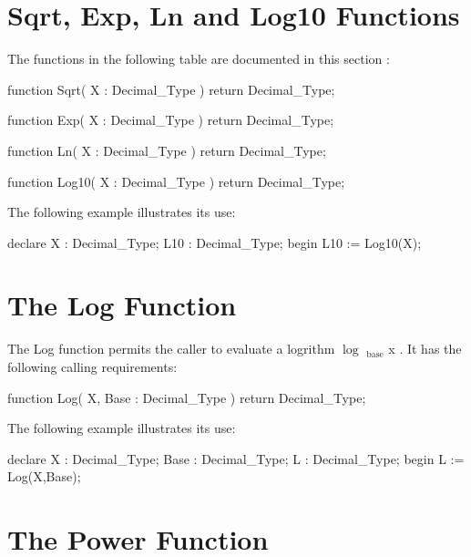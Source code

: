 \documentclass[english,letterpaper]{book}
\begin{document}
\section{Sqrt, Exp, Ln and Log10 Functions}

The functions in the following table are documented in this section%
:

\begin{Code}
function Sqrt(
   X : Decimal_Type
) return Decimal_Type;
\end{Code}

\begin{Code}
function Exp(
   X : Decimal_Type
) return Decimal_Type;
\end{Code}

\begin{Code}
function Ln(
   X : Decimal_Type
) return Decimal_Type;
\end{Code}

\begin{Code}
function Log10(
   X : Decimal_Type
) return Decimal_Type;
\end{Code}

The following example illustrates its use:

\begin{Example}
declare
   X :   Decimal_Type;
   L10 : Decimal_Type;
begin
   L10 := Log10(X);
\end{Example}

\section{The Log Function}

The Log function permits the caller to evaluate a logrithm $\log$
$_{\textrm{base}}$ x . It has the following calling requirements:

\begin{Code}
function Log(
   X, Base : Decimal_Type
) return Decimal_Type;
\end{Code}

The following example illustrates its use:

\begin{Example}
declare
   X :    Decimal_Type;
   Base : Decimal_Type;
   L :    Decimal_Type;
begin
   L := Log(X,Base);
\end{Example}

\section{The Power Function}
\end{document}
